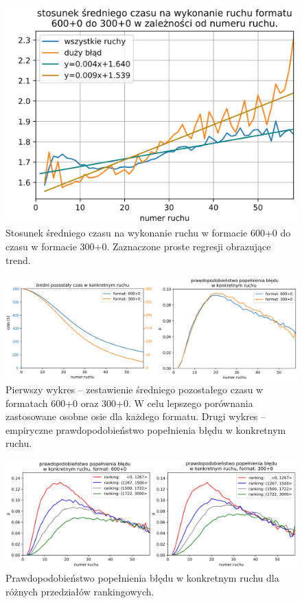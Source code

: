 \documentclass[inzynierska]{pwr_wmat_praca_dyplomowa}
\theoremstyle{plain}
\numberwithin{theorem}{chapter}
\theoremstyle{definition}
\numberwithin{theorem}{chapter}
\begin{document}
\begin{figure}[H]
	\centering
	\includegraphics[width=\textwidth]{stosunek_sr_czas.png}
	\caption{Stosunek średniego czasu na wykonanie ruchu w formacie 600+0 do czasu w formacie 300+0. Zaznaczone proste regresji obrazujące trend.}
	\label{rys:stosunek_sr_czas}
\end{figure}
\begin{figure}[H]
	\centering
	\includegraphics[width=\textwidth]{pozostaly_czas.png}
	\caption{
		Pierwszy wykres -- zestawienie średniego pozostałego czasu w formatach 600+0 oraz 300+0. W celu lepszego porównania zastosowane osobne osie dla każdego formatu. Drugi wykres -- empiryczne prawdopodobieństwo popełnienia błędu w konkretnym ruchu.}
	\label{rys:pozostaly_czas}
\end{figure}
\begin{figure}[H]
	\centering
	\includegraphics[width=\textwidth]{prawd_blad_ELO.png}
	\caption{Prawdopodobieństwo popełnienia błędu w konkretnym ruchu dla różnych przedziałów rankingowych.}
	\label{rys:prawd_blad_ELO}
\end{figure}
\end{document}
